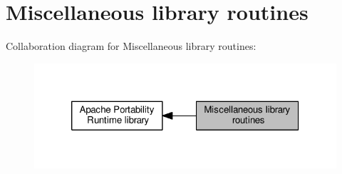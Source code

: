 \hypertarget{group__apr__general}{}\section{Miscellaneous library routines}
\label{group__apr__general}
Collaboration diagram for Miscellaneous library routines\+:
\nopagebreak
\begin{figure}[H]
\begin{center}
\leavevmode
\includegraphics[width=320pt]{group__apr__general}
\end{center}
\end{figure}
